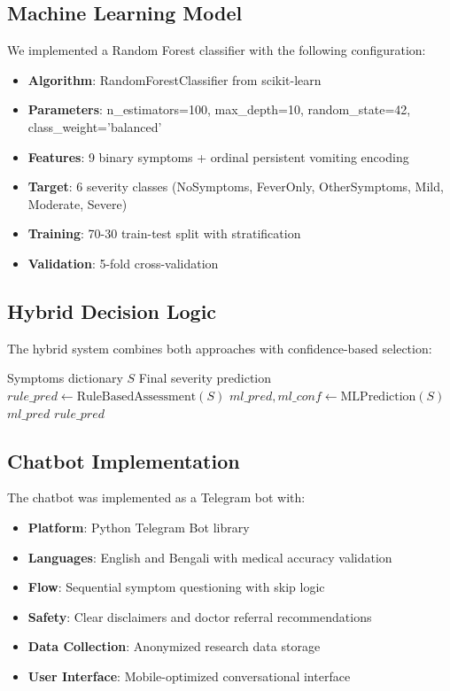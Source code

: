 \documentclass[conference]{IEEEtran}
\begin{document}
\subsection{Machine Learning Model}
We implemented a Random Forest classifier with the following configuration:

\begin{itemize}
\item \textbf{Algorithm}: RandomForestClassifier from scikit-learn
\item \textbf{Parameters}: n\_estimators=100, max\_depth=10, random\_state=42, class\_weight='balanced'
\item \textbf{Features}: 9 binary symptoms + ordinal persistent vomiting encoding
\item \textbf{Target}: 6 severity classes (NoSymptoms, FeverOnly, OtherSymptoms, Mild, Moderate, Severe)
\item \textbf{Training}: 70-30 train-test split with stratification
\item \textbf{Validation}: 5-fold cross-validation
\end{itemize}

\subsection{Hybrid Decision Logic}
The hybrid system combines both approaches with confidence-based selection:

\begin{algorithm}[h]
\caption{Hybrid Severity Prediction}
\begin{algorithmic}[1]
\REQUIRE Symptoms dictionary $S$
\ENSURE Final severity prediction
\STATE $rule\_pred \gets \text{RuleBasedAssessment}(S)$
\STATE $ml\_pred, ml\_conf \gets \text{MLPrediction}(S)$
    \RETURN $ml\_pred$
\ELSE
    \RETURN $rule\_pred$
\ENDIF
\end{algorithmic}
\end{algorithm}

\subsection{Chatbot Implementation}
The chatbot was implemented as a Telegram bot with:

\begin{itemize}
\item \textbf{Platform}: Python Telegram Bot library
\item \textbf{Languages}: English and Bengali with medical accuracy validation
\item \textbf{Flow}: Sequential symptom questioning with skip logic
\item \textbf{Safety}: Clear disclaimers and doctor referral recommendations
\item \textbf{Data Collection}: Anonymized research data storage
\item \textbf{User Interface}: Mobile-optimized conversational interface
\end{itemize}
\end{document}
